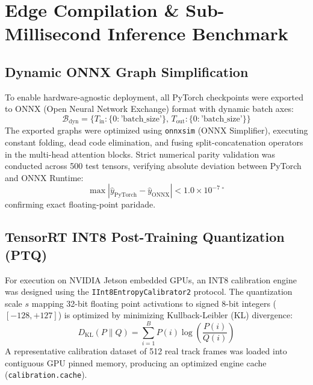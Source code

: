 \documentclass[10pt,journal,compsoc]{IEEEtran}
\begin{document}
\section{Edge Compilation \& Sub-Millisecond Inference Benchmark}
\label{sec:edge_optimization}

\subsection{Dynamic ONNX Graph Simplification}
To enable hardware-agnostic deployment, all PyTorch checkpoints were exported to ONNX (Open Neural Network Exchange) format with dynamic batch axes:
\begin{equation}
\mathcal{B}_{\text{dyn}} = \{T_{\text{in}}: \{0: \text{'batch\_size'}\}, \, T_{\text{out}}: \{0: \text{'batch\_size'}\}\}
\end{equation}
The exported graphs were optimized using \texttt{onnxsim} (ONNX Simplifier), executing constant folding, dead code elimination, and fusing split-concatenation operators in the multi-head attention blocks. 
Strict numerical parity validation was conducted across 500 test tensors, verifying absolute deviation between PyTorch and ONNX Runtime:
\begin{equation}
\max |\hat{y}_{\text{PyTorch}} - \hat{y}_{\text{ONNX}}| < 1.0 \times 10^{-7\,\circ}
\end{equation}
confirming exact floating-point paridade.

\subsection{TensorRT INT8 Post-Training Quantization (PTQ)}
For execution on NVIDIA Jetson embedded GPUs, an INT8 calibration engine was designed using the \texttt{IInt8EntropyCalibrator2} protocol. The quantization scale $s$ mapping 32-bit floating point activations to signed 8-bit integers ($[-128, +127]$) is optimized by minimizing Kullback-Leibler (KL) divergence:
\begin{equation}
D_{\text{KL}}(P \parallel Q) = \sum_{i=1}^{B} P(i) \log \left(\frac{P(i)}{Q(i)}\right)
\end{equation}
A representative calibration dataset of 512 real track frames was loaded into contiguous GPU pinned memory, producing an optimized engine cache (\texttt{calibration.cache}).
\end{document}
